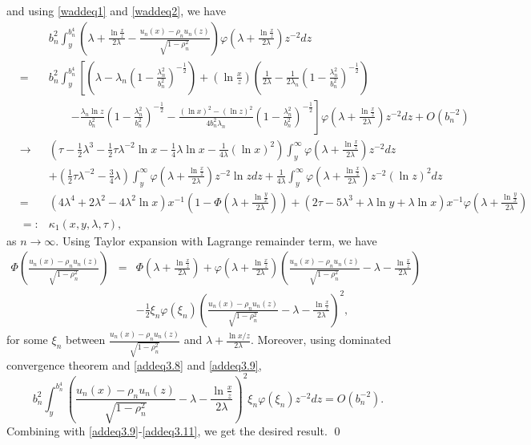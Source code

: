 \documentclass[10pt,twosided]{article}
\numberwithin{equation}{section}
\numberwithin{equation}{section}
\begin{document}
and using \eqref{waddeq1} and \eqref{waddeq2}, we have
\begin{eqnarray}\label{addeq3.9}
&&b_n^2\int_y^{b_{n}^{4}}\left(\lambda+\frac{\ln \frac{x}{z}}{2\lambda}-\frac{u_n(x)-\rho_n u_n(z)}{\sqrt{1-\rho_n^2}}\right)
\varphi\left(\lambda+\frac{\ln \frac{x}{z}}{2\lambda}\right)z^{-2}dz \nonumber\\
&=&b_n^2\int_y^{b_{n}^{4}}\left[\left(\lambda-\lambda_n \left(1-\frac{\lambda_n^2}{b_n^2}\right)^{-\frac{1}{2}}\right)
+\left(\ln \frac{x}{z}\right)\left(\frac{1}{2\lambda}-\frac{1}{2\lambda_n}\left(1-\frac{\lambda_n^2}{b_n^2}\right)^{-\frac{1}{2}}\right)\right.\nonumber\\
&&\qquad  \left.-\frac{\lambda_n\ln z}{b_n^2}\left(1-\frac{\lambda_n^2}{b_n^2}\right)^{-\frac{1}{2}}
-\frac{(\ln x)^2-(\ln z)^2}{4b_n^2\lambda_n}\left(1-\frac{\lambda_n^2}{b_n^2}\right)^{-\frac{1}{2}}\right]
\varphi\left(\lambda+\frac{\ln \frac{x}{z}}{2\lambda}\right)z^{-2}dz +O(b_n^{-2}) \nonumber\\
&\to&\left(\tau-\frac{1}{2}\lambda^3-\frac{1}{2}\tau \lambda^{-2}\ln x-\frac{1}{4}\lambda \ln x -\frac{1}{4\lambda}(\ln x)^2\right)
\int_y^{\infty}\varphi\left(\lambda+\frac{\ln \frac{x}{z}}{2\lambda}\right)z^{-2}dz\nonumber\\
&&+(\frac{1}{2}\tau \lambda^{-2}-\frac{3}{4}\lambda)
\int_y^{\infty}\varphi\left(\lambda+\frac{\ln \frac{x}{z}}{2\lambda}\right)z^{-2}\ln z dz
+\frac{1}{4\lambda}\int_y^{\infty}\varphi\left(\lambda+\frac{\ln \frac{x}{z}}{2\lambda}\right)z^{-2}(\ln z)^2 dz\nonumber\\
&=&(4\lambda^4+2\lambda^2-4\lambda^2\ln x)x^{-1}\left(1-\Phi\left(\lambda+\frac{\ln \frac{y}{x}}{2\lambda}\right)\right) +(2\tau -5\lambda^3+\lambda \ln y+\lambda \ln x )x^{-1}\varphi\left(\lambda+\frac{\ln \frac{y}{x}}{2\lambda}\right)\nonumber\\
&=:&\kappa_1(x,y,\lambda,\tau),
\end{eqnarray}
as $n\to \infty$.
Using Taylor expansion with Lagrange remainder term, we have
\begin{eqnarray}\label{addeq3.10}
\Phi\left(\frac{u_n(x)-\rho_n u_n(z)}{\sqrt{1-\rho_n^2}}\right)&=&
\Phi\left(\lambda+\frac{\ln \frac{x}{z}}{2\lambda}\right)
+\varphi\left(\lambda+\frac{\ln \frac{x}{z}}{2\lambda}\right)
\left(\frac{u_n(x)-\rho_n u_n(z)}{\sqrt{1-\rho_n^2}}-\lambda-\frac{\ln \frac{x}{z}}{2\lambda}\right)\nonumber\\
&&-\frac{1}{2}\xi_n\varphi(\xi_n)\left(\frac{u_n(x)-\rho_n u_n(z)}{\sqrt{1-\rho_n^2}}-\lambda-\frac{\ln \frac{x}{z}}{2\lambda}\right)^2,
\end{eqnarray}
for some $\xi_n$ between $\frac{u_n(x)-\rho_n u_n(z)}{\sqrt{1-\rho_n^2}}$ and $\lambda+\frac{\ln x/z}{2\lambda}$. Moreover, using
dominated convergence theorem and \eqref{addeq3.8} and \eqref{addeq3.9},
\begin{equation}\label{addeq3.11}
b_n^2\int_y^{b_n^4}\left(\frac{u_n(x)-\rho_n u_n(z)}{\sqrt{1-\rho_n^2}}-\lambda-\frac{\ln \frac{x}{z}}{2\lambda}\right)^2
\xi_n\varphi(\xi_n)z^{-2}dz=O(b_n^{-2}).
\end{equation}
Combining with \eqref{addeq3.9}-\eqref{addeq3.11}, we get the desired result. \qed
\end{document}
